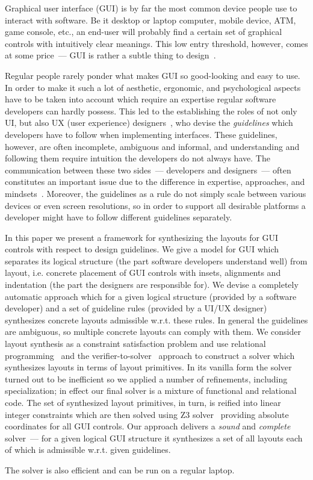 

\label{sec:intro}

Graphical user interface (GUI) is by far the most common device people use to interact with software. Be it desktop
or laptop computer, mobile device, ATM, game console, etc., an end-user will probably find a certain set
of graphical controls with intuitively clear meanings. This low entry threshold, however, comes at some
price~--- GUI is rather a subtle thing to design~\cite{UI1,UI12}.

Regular people rarely ponder what makes GUI so good-looking and easy to use. In order to make it such a lot of
aesthetic, ergonomic, and psychological aspects have to be taken into account which require an expertise
regular software developers can hardly possess. This led to the establishing the roles of not only UI, but also UX
(user experience) designers~\cite{UI5}, who devise the \emph{guidelines} which developers have to
follow when implementing interfaces. These guidelines, however, are often incomplete, ambiguous and informal, and understanding
and following them require intuition the developers do not always have.  The communication between these two
sides~--- developers and designers~---  often constitutes an important issue due to the difference in
expertise, approaches, and mindsets~\cite{UI6}. Moreover, the guidelines as a rule
do not simply scale between various devices or even screen resolutions, so in order to support all desirable
platforms a developer might have to follow different guidelines separately.

In this paper we present a framework for synthesizing the layouts for GUI controls with respect to design guidelines. We give a model for GUI
which separates its logical structure (the part software developers understand well) from layout, i.e. concrete placement
of GUI controls with insets, alignments and indentation (the part the designers are responsible for). We devise a completely automatic approach
which for a given logical structure (provided by a software developer) and a set of guideline rules (provided by a UI/UX designer) synthesizes
concrete layouts admissible w.r.t. these rules. In general the guidelines are ambiguous, so multiple concrete layouts can
comply with them. We consider layout synthesis as a constraint satisfaction problem and use relational programming~\cite{TRS}
and the verifier-to-solver~\cite{searchproblems} approach to construct a solver which synthesizes layouts in terms of layout primitives. In its
vanilla form the solver turned out to be inefficient so we applied a number of refinements, including specialization; in effect our
final solver is a mixture of functional and relational code. The set of synthesized layout primitives, in turn, is reified into linear
integer constraints which are then solved using \textsc{Z3} solver~\cite{Zthree} providing absolute coordinates for all GUI controls.
Our approach delivers a \emph{sound} and \emph{complete} solver~--- for a given logical GUI structure it synthesizes a set of all layouts each of which is
admissible w.r.t. given guidelines.

The solver is also efficient and can be run on a regular laptop.

